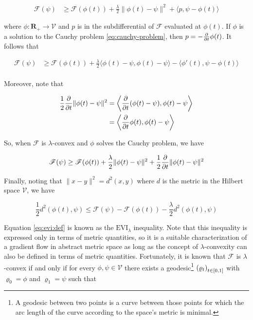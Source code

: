 \begin{align*}
  \mathscr{F}(\psi) &\geq \mathscr{F}(\phi(t)) + \frac{\lambda}{2}\|\phi(t) - \psi\|^2 +
  \langle p, \psi - \phi(t)\rangle
\end{align*}

where $\phi:\mathbf{R}_+\to\mathcal{V}$ and $p$ is in the subdifferential of
$\mathscr{F}$ evaluated at $\phi(t)$. If $\phi$ is a solution to the Cauchy
problem \eqref{eq:cauchy-problem}, then $p = -\partialderiv{}{t}\phi(t)$. It
follows that

\begin{align*}
  \mathscr{F}(\psi) &\geq \mathscr{F}(\phi(t)) + \frac{\lambda}{2}\langle\phi(t) -
  \psi, \phi(t) - \psi\rangle - \langle \phi'(t), \psi - \phi(t)\rangle\\
\end{align*}

Moreover, note that

\begin{align*}
  \frac{1}{2}\partialderiv{}{t}\|\phi(t) - \psi\|^2 &=
  \left\langle\partialderiv{}{t}(\phi(t) - \psi), \phi(t) - \psi\right\rangle\\
                                                    &=
                                                    \left\langle\partialderiv{}{t}\phi(t),
                                                      \phi(t) -
                                                      \psi\right\rangle\\
\end{align*}

So, when $\mathscr{F}$ is $\lambda$-convex and $\phi$ solves the Cauchy problem,
we have

\begin{align*}
  \mathscr{F}(\psi) &\geq\mathscr{F}(\phi(t)) + \frac{\lambda}{2}\|\phi(t) -
  \psi\|^2 + \frac{1}{2}\partialderiv{}{t}\|\phi(t) - \psi\|^2\\
\end{align*}

Finally, noting that $\|x - y\|^2 = d^2(x, y)$ where $d$ is the metric in the
Hilbert space $\mathcal{V}$, we have

\begin{equation}\label{eq:evi:def}
  \frac{1}{2}d^2(\phi(t), \psi) \leq \mathscr{F}(\psi) - \mathscr{F}(\phi(t)) -
  \frac{\lambda}{2}d^2(\phi(t), \psi)
\end{equation}

Equation \eqref{eq:evi:def} is known as the $\text{EVI}_\lambda$ inequality.
Note that this inequality is expressed only in terms of metric quantities, so it
is a suitable characterization of a gradient flow in abstract metric space as
long as the concept of $\lambda$-convexity can also be defined in terms of
metric quantities. Fortunately, it is known \citep{muratori2018gradient} that
$\mathscr{F}$ is $\lambda$-convex if and only if
for every
$\phi,\psi\in\mathcal{V}$ there exists a geodesic\footnote{A geodesic between
  two points is a curve between those points for which the arc length of the
  curve according to the space's metric is minimal.}
$\indexedin{[0,1]}{t}{\varrho}$ with $\varrho_0 = \phi$ and $\varrho_1=\psi$
such that

